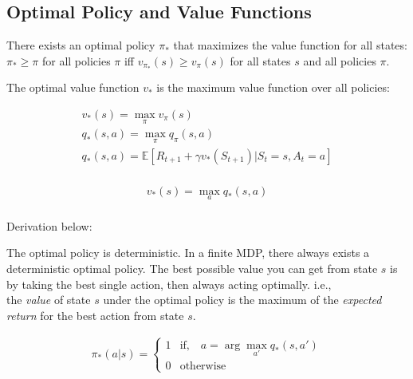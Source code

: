  \subsection{Optimal Policy and Value Functions}

 There exists an optimal policy $\pi_*$ that maximizes the value function for all states:\\
 $\pi_* \geq \pi$ for all policies $\pi$ iff $v_{\pi_{*}}(s) \geq v_\pi(s)$ for all states $s$
 and all policies $\pi$.

 The optimal value function $v_*$ is the maximum value function over all policies:

 \begin{equation}
    \begin{split}
        v_*(s) = \max_{\pi} v_\pi(s) \\
        q_*(s, a) = \max_{\pi} q_\pi(s, a) \\
        q_*(s, a) = \mathbb{E}[R_{t+1} + \gamma v_*(S_{t+1}) | S_t = s, A_t = a] \\
        \label{eq:mdp-optimal-value-function}
    \end{split}
 \end{equation}

 \begin{equation}
    \begin{split}
        v_*(s) = \max_{a} q_*(s, a) \\
        \label{eq:mdp-optimal-value-function_reduced}
    \end{split}
 \end{equation}

Derivation below:

The optimal policy is deterministic. In a finite MDP, there always exists a deterministic
optimal policy. The best possible value you can get from state $s$
is by taking the best single action, then always acting optimally. i.e.,\\
the  \textit{value} of state $s$ under the optimal policy is the maximum of the \textit{expected return} for the best
action from state $s$.

\begin{equation}
    \begin{split}
        \pi_*(a|s) = \begin{cases}
            1 & \text{if,} \quad a = \arg \max_{a'} q_*(s, a') \\
            0 & \text{otherwise}
        \end{cases}
    \end{split}
\end{equation}


